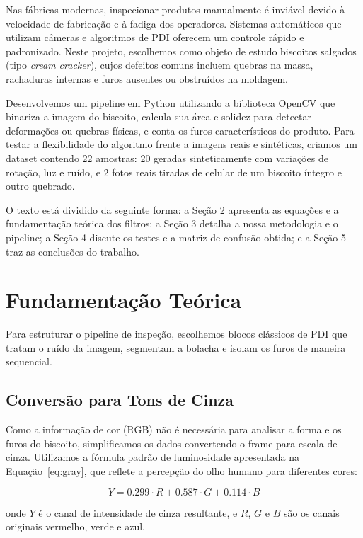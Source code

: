 \documentclass[12pt]{article}
\begin{document}
Nas fábricas modernas, inspecionar produtos manualmente é inviável devido à velocidade de fabricação e à fadiga dos operadores. Sistemas automáticos que utilizam câmeras e algoritmos de PDI oferecem um controle rápido e padronizado. Neste projeto, escolhemos como objeto de estudo biscoitos salgados (tipo \textit{cream cracker}), cujos defeitos comuns incluem quebras na massa, rachaduras internas e furos ausentes ou obstruídos na moldagem.

Desenvolvemos um pipeline em Python utilizando a biblioteca OpenCV que binariza a imagem do biscoito, calcula sua área e solidez para detectar deformações ou quebras físicas, e conta os furos característicos do produto. Para testar a flexibilidade do algoritmo frente a imagens reais e sintéticas, criamos um dataset contendo 22 amostras: 20 geradas sinteticamente com variações de rotação, luz e ruído, e 2 fotos reais tiradas de celular de um biscoito íntegro e outro quebrado.

O texto está dividido da seguinte forma: a Seção 2 apresenta as equações e a fundamentação teórica dos filtros; a Seção 3 detalha a nossa metodologia e o pipeline; a Seção 4 discute os testes e a matriz de confusão obtida; e a Seção 5 traz as conclusões do trabalho.

\section{Fundamentação Teórica}

Para estruturar o pipeline de inspeção, escolhemos blocos clássicos de PDI que tratam o ruído da imagem, segmentam a bolacha e isolam os furos de maneira sequencial.

\subsection{Conversão para Tons de Cinza}

Como a informação de cor (RGB) não é necessária para analisar a forma e os furos do biscoito, simplificamos os dados convertendo o frame para escala de cinza. Utilizamos a fórmula padrão de luminosidade apresentada na Equação~\ref{eq:gray}, que reflete a percepção do olho humano para diferentes cores:

\begin{equation}
Y = 0.299 \cdot R + 0.587 \cdot G + 0.114 \cdot B
\label{eq:gray}
\end{equation}

onde $Y$ é o canal de intensidade de cinza resultante, e $R$, $G$ e $B$ são os canais originais vermelho, verde e azul.
\end{document}
